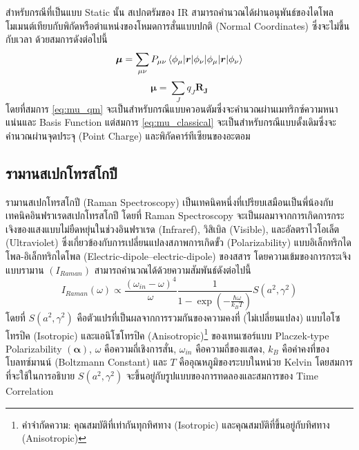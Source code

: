 สำหรับกรณีที่เป็นแบบ Static นั้น สเปกตรัมของ IR สามารถคำนวณได้ผ่านอนุพันธ์ของไดโพลโมเมนต์เทียบกับพิกัดหรือตำแหน่งของโหมดการสั่นแบบปกติ (Normal Coordinates) ซึ่งจะไม่ขึ้นกับเวลา ด้วยสมการดังต่อไปนี้
%
\begin{equation}\label{eq:mu_qm}
    \bm{\mu} = \sum_{\mu\nu} P_{\mu\nu} \braket{\phi_{\mu}|\bm{r}|\phi_{\nu}}
\end{equation}
%
\begin{equation}\label{eq:mu_classical}
    \bm{\mu} = \sum_{J} q_J \bm{R_J}
\end{equation}
%
โดยที่สมการ \eqref{eq:mu_qm} จะเป็นสำหรับกรณีแบบควอนตัมซึ่งจะคำนวณผ่านเมทริกซ์ความหนาแน่นและ Basis Function แต่สมการ
\eqref{eq:mu_classical} จะเป็นสำหรับกรณีแบบดั้งเดิมซึ่งจะคำนวณผ่านจุดประจุ (Point Charge) และพิกัดคาร์ทีเซียนของอะตอม

\subsection{รามานสเปกโทรสโกปี}
\label{ssec:raman_spectro}

รามานสเปกโทรสโกปี (Raman Spectroscopy) เป็นเทคนิคหนึ่งที่เปรียบเสมือนเป็นพี่น้องกับเทคนิคอินฟราเรดสเปกโทรสโกปี โดยที่ Raman Spectroscopy จะเป็นผลมาจากการเกิดการกระเจิงของแสงแบบไม่ยืดหยุ่นในช่วงอินฟราเรด (Infraref), วิสิเบิล (Visible), และอัลตราไวโอเล็ต (Ultraviolet) ซึ่งเกี่ยวข้องกับการเปลี่ยนแปลงสภาพการเกิดขั้ว (Polarizability) แบบอิเล็กทริกไดโพล-อิเล็กทริกไดโพล (Electric-dipole--electric-dipole) ของสสาร โดยความเข้มของการกระเจิงแบบรามาน $(I_{Raman})$ สามารถคำนวณได้ด้วยความสัมพันธ์ดังต่อไปนี้\autocite{thomas2013}
%
\begin{equation}\label{eq:Raman_corr}
    I_{Raman} (\omega) \propto \frac{(\omega_{in}-\omega)^4}{\omega}
    \frac{1}{1-\exp(-\frac{\hbar\omega}{k_{B}T})}S(a^{2}, \gamma^{2})
\end{equation}
%
\noindent โดยที่ $S(a^{2}, \gamma^{2})$ คือตัวแปรที่เป็นผลจากการรวมกันของความคงที่ (ไม่เปลี่ยนแปลง) แบบไอโซโทรปิค (Isotropic) และแอนิโซโทรปิค (Anisotropic)\footnote{คำจำกัดความ: คุณสมบัติที่เท่ากันทุกทิศทาง (Isotropic) และคุณสมบัติที่ขึ้นอยู่กับทิศทาง (Anisotropic)} ของเทนเซอร์แบบ Placzek-type Polarizability $(\bm{\alpha})$\autocite{jensen2005}, $\omega$ คือความถี่เชิงการสั่น, $\omega_{in}$ คือความถี่ของแสดง, $k_{B}$ คือค่าคงที่ของโบลทซ์มานน์ (Boltzmann Constant) และ $T$ คืออุณหภูมิของระบบในหน่วย Kelvin โดยสมการที่จะใช้ในการอธิบาย $S(a^{2}, \gamma^{2})$ จะขึ้นอยู่กับรูปแบบของการทดลองและสมการของ Time Correlation\autocite{mattiat2021}

